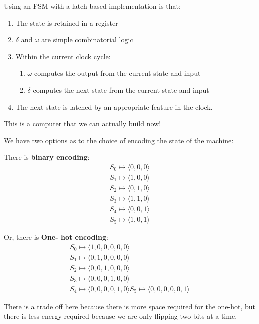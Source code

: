 \documentclass[11pt,a4paper,titlepage,dvipsnames,cmyk]{scrartcl}
\begin{document}
Using an FSM with a latch based implementation is that:
\begin{enumerate}
    \item The state is retained in a register
    \item $\delta$ and $\omega$ are simple combinatorial logic
    \item Within the current clock cycle:
        \begin{enumerate}
            \item $\omega$ computes the output from the current state and
                input
            \item $\delta$ computes the next state from the current state
                and input
        \end{enumerate}
    \item The next state is latched by an appropriate feature in the
        clock.
\end{enumerate}

This is a computer that we can actually build now!

We have two options as to the choice of encoding the state of the machine:

There is \textbf{binary encoding}:
\begin{align*}
    S_0 \mapsto \langle 0, 0, 0 \rangle \\
    S_1 \mapsto \langle 1, 0, 0 \rangle \\
    S_2 \mapsto \langle 0, 1, 0 \rangle \\
    S_3 \mapsto \langle 1, 1, 0 \rangle \\
    S_4 \mapsto \langle 0, 0, 1 \rangle \\
    S_5 \mapsto \langle 1, 0, 1 \rangle 
\end{align*}

Or, there is \textbf{One- hot encoding}:
\begin{align*}
    S_0 \mapsto \langle 1, 0, 0, 0, 0, 0 \rangle \\
    S_1 \mapsto \langle 0, 1, 0, 0, 0, 0 \rangle \\
    S_2 \mapsto \langle 0, 0, 1, 0, 0, 0 \rangle \\
    S_3 \mapsto \langle 0, 0, 0, 1, 0, 0 \rangle \\
    S_4 \mapsto \langle 0, 0, 0, 0, 1, 0 \rangle 
    S_5 \mapsto \langle 0, 0, 0, 0, 0, 1 \rangle 
\end{align*}

There is a trade off here because there is more space required for the
one-hot, but there is less energy required because we are only flipping
two bits at a time.
\end{document}
